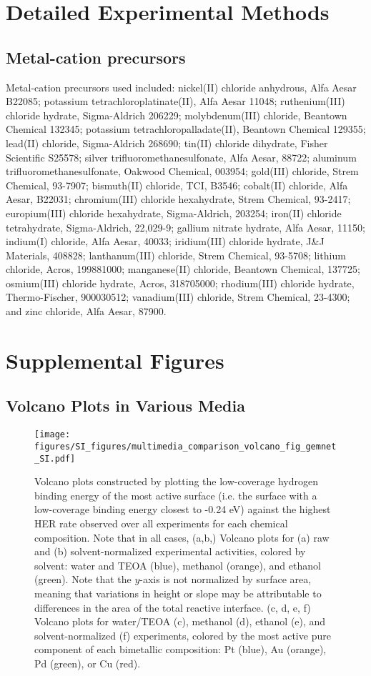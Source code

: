 \documentclass[journal=accacs,manuscript=suppinfo]{achemso}
\begin{document}
\tableofcontents

\section{Detailed Experimental Methods}
\subsection{Metal-cation precursors}
Metal-cation precursors used included: nickel(II) chloride anhydrous, Alfa Aesar B22085; potassium tetrachloroplatinate(II), Alfa Aesar 11048; ruthenium(III) chloride hydrate, Sigma-Aldrich 206229; molybdenum(III) chloride, Beantown Chemical 132345; potassium tetrachloropalladate(II), Beantown Chemical 129355; lead(II) chloride, Sigma-Aldrich 268690; tin(II) chloride dihydrate, Fisher Scientific S25578; silver trifluoromethanesulfonate, Alfa Aesar, 88722; aluminum trifluoromethanesulfonate, Oakwood Chemical, 003954; gold(III) chloride, Strem Chemical, 93-7907; bismuth(II) chloride, TCI, B3546; cobalt(II) chloride, Alfa Aesar, B22031; chromium(III) chloride hexahydrate, Strem Chemical, 93-2417; europium(III) chloride hexahydrate, Sigma-Aldrich, 203254; iron(II) chloride tetrahydrate, Sigma-Aldrich, 22,029-9; gallium nitrate hydrate, Alfa Aesar, 11150; indium(I) chloride, Alfa Aesar, 40033; iridium(III) chloride hydrate, J\&J Materials, 408828; lanthanum(III) chloride, Strem Chemical, 93-5708; lithium chloride, Acros, 199881000; manganese(II) chloride, Beantown Chemical, 137725; osmium(III) chloride hydrate, Acros, 318705000; rhodium(III) chloride hydrate, Thermo-Fischer, 900030512; vanadium(III) chloride, Strem Chemical, 23-4300; and zinc chloride, Alfa Aesar, 87900.

\section{Supplemental Figures}
\subsection{Volcano Plots in Various Media}
\begin{figure}[H]
\centering
    \texttt{[image: figures/SI\_figures/multimedia\_comparison\_volcano\_fig\_gemnet\_SI.pdf]}
\caption{Volcano plots constructed by plotting the low-coverage hydrogen binding energy of the most active surface (i.e. the surface with a low-coverage binding energy closest to -0.24 eV) against the highest \gls{HER} rate observed over all experiments for each chemical composition. Note that in all cases,  (a,b,) Volcano plots for (a) raw and (b) solvent-normalized experimental activities, colored by solvent: water and TEOA (blue), methanol (orange), and ethanol (green). Note that the $y$-axis is not normalized by surface area, meaning that variations in height or slope may be attributable to differences in the area of the total reactive interface. (c, d, e, f) Volcano plots for water/TEOA (c), methanol (d), ethanol (e), and solvent-normalized (f) experiments, colored by the most active pure component of each bimetallic composition: Pt (blue), Au (orange), Pd (green), or Cu (red).}
\label{fig:ComparisonSI}
\end{figure}
\end{document}
